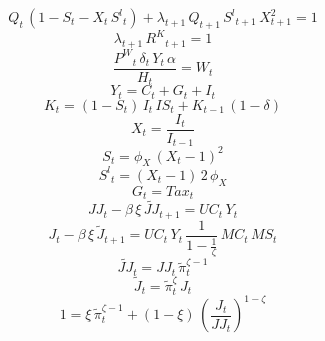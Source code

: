 \begin{dmath}
{Q}_{t}\, \left(1-{S}_{t}-{X}_{t}\, {S^{l}}_{t}\right)+{\lambda}_{t+1}\, {Q}_{t+1}\, {S^{l}}_{t+1}\, {X}_{t+1}^{2}=1
\end{dmath}
\begin{dmath}
{\lambda}_{t+1}\, {R^{K}}_{t+1}=1
\end{dmath}
\begin{dmath}
\frac{{P^{W}}_{t}\, {\delta}_{t}\, {Y}_{t}\, {{\alpha}}}{{H}_{t}}={W}_{t}
\end{dmath}
\begin{dmath}
{Y}_{t}={C}_{t}+{G}_{t}+{I}_{t}
\end{dmath}
\begin{dmath}
{K}_{t}=\left(1-{S}_{t}\right)\, {I}_{t}\, {IS}_{t}+{K}_{t-1}\, \left(1-{{\delta}}\right)
\end{dmath}
\begin{dmath}
{X}_{t}=\frac{{I}_{t}}{{I}_{t-1}}
\end{dmath}
\begin{dmath}
{S}_{t}={{\phi_{X}}}\, \left({X}_{t}-1\right)^{2}
\end{dmath}
\begin{dmath}
{S^{l}}_{t}=\left({X}_{t}-1\right)\, 2\, {{\phi_{X}}}
\end{dmath}
\begin{dmath}
{G}_{t}={Tax}_{t}
\end{dmath}
\begin{dmath}
{JJ}_{t}-{{\beta}}\, {{\xi}}\, {\tilde{JJ}}_{t+1}={UC}_{t}\, {Y}_{t}
\end{dmath}
\begin{dmath}
{J}_{t}-{{\beta}}\, {{\xi}}\, {\tilde{J}}_{t+1}={UC}_{t}\, {Y}_{t}\, \frac{1}{1-\frac{1}{{{\zeta}}}}\, {MC}_{t}\, {MS}_{t}
\end{dmath}
\begin{dmath}
{\tilde{JJ}}_{t}={JJ}_{t}\, {\tilde{\pi}}_{t}^{{{\zeta}}-1}
\end{dmath}
\begin{dmath}
{\tilde{J}}_{t}={\tilde{\pi}}_{t}^{{{\zeta}}}\, {J}_{t}
\end{dmath}
\begin{dmath}
1={{\xi}}\, {\tilde{\pi}}_{t}^{{{\zeta}}-1}+\left(1-{{\xi}}\right)\, \left(\frac{{J}_{t}}{{JJ}_{t}}\right)^{1-{{\zeta}}}
\end{dmath}
